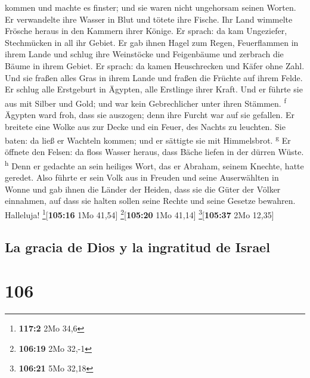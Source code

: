 kommen und machte es finster; und sie waren nicht ungehorsam seinen
Worten.  Er verwandelte ihre Wasser in Blut und tötete
ihre Fische.  Ihr Land wimmelte Frösche heraus in den
Kammern ihrer Könige.  Er sprach: da kam Ungeziefer,
Stechmücken in all ihr Gebiet.  Er gab ihnen Hagel zum
Regen, Feuerflammen in ihrem Lande  und schlug ihre
Weinstöcke und Feigenbäume und zerbrach die Bäume in ihrem Gebiet.
 Er sprach: da kamen Heuschrecken und Käfer ohne Zahl.
 Und sie fraßen alles Gras in ihrem Lande und fraßen die
Früchte auf ihrem Felde.  Er schlug alle Erstgeburt in
Ägypten, alle Erstlinge ihrer Kraft.  Und er führte sie
aus mit Silber und Gold; und war kein Gebrechlicher unter ihren Stämmen.
\textsuperscript{f}  Ägypten ward froh, dass sie
auszogen; denn ihre Furcht war auf sie gefallen.  Er
breitete eine Wolke aus zur Decke und ein Feuer, des Nachts zu leuchten.
 Sie baten: da ließ er Wachteln kommen; und er sättigte
sie mit Himmelsbrot. \textsuperscript{g}  Er öffnete den
Felsen: da floss Wasser heraus, dass Bäche liefen in der dürren Wüste.
\textsuperscript{h}  Denn er gedachte an sein heiliges
Wort, das er Abraham, seinem Knechte, hatte geredet. 
Also führte er sein Volk aus in Freuden und seine Auserwählten in Wonne
 und gab ihnen die Länder der Heiden, dass sie die Güter
der Völker einnahmen,  auf dass sie halten sollen seine
Rechte und seine Gesetze bewahren. Halleluja!
\footnote{\textbf{117:2} 2Mo 34,6}{[}\textbf{105:16} 1Mo 41,54{]}
\footnote{\textbf{106:19} 2Mo 32,-1}{[}\textbf{105:20} 1Mo 41,14{]}
\footnote{\textbf{106:21} 5Mo 32,18}{[}\textbf{105:37} 2Mo 12,35{]}

\hypertarget{la-gracia-de-dios-y-la-ingratitud-de-israel}{%
\subsection{La gracia de Dios y la ingratitud de
Israel}\label{la-gracia-de-dios-y-la-ingratitud-de-israel}}

\hypertarget{section-105}{%
\section{106}\label{section-105}}

